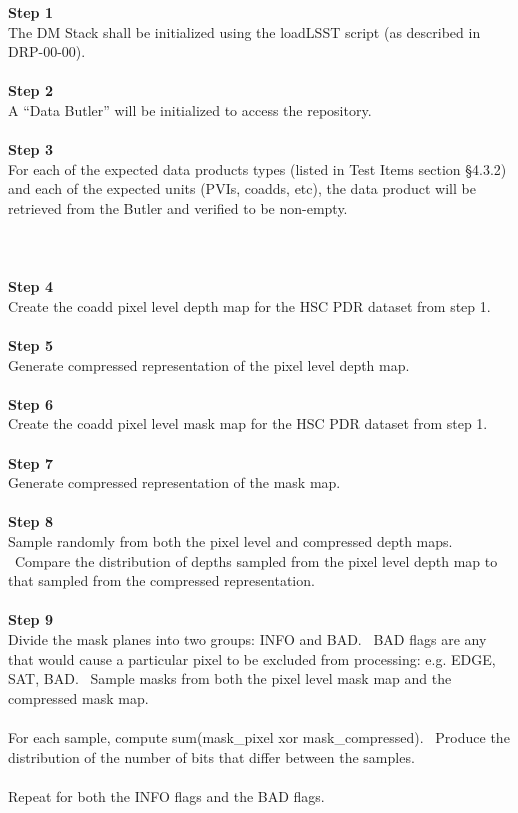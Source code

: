 \textbf{Step 1}\\
The DM Stack shall be initialized using the loadLSST script (as
described in DRP-00-00).\\
~\\
\textbf{Step 2}\\
A ``Data Butler'' will be initialized to access the repository.\\
~\\
\textbf{Step 3}\\
For each of the expected data products types (listed in Test Items
section §4.3.2) and each of the expected units (PVIs, coadds, etc), the
data product will be retrieved from the Butler and verified to be
non-empty.\\
~\\
~\\
~\\
\textbf{Step 4}\\
Create the coadd pixel level depth map for the HSC PDR dataset from step
1.\\
~\\
\textbf{Step 5}\\
Generate compressed representation of the pixel level depth map.\\
~\\
\textbf{Step 6}\\
Create the coadd pixel level mask map for the HSC PDR dataset from step
1.\\
~\\
\textbf{Step 7}\\
Generate compressed representation of the mask map.\\
~\\
\textbf{Step 8}\\
Sample randomly from both the pixel level and compressed depth maps.
~Compare the distribution of depths sampled from the pixel level depth
map to that sampled from the compressed representation.\\
~\\
\textbf{Step 9}\\
Divide the mask planes into two groups: INFO and BAD. ~BAD flags are any
that would cause a particular pixel to be excluded from processing: e.g.
EDGE, SAT, BAD. ~Sample masks from both the pixel level mask map and the
compressed mask map.\\
~\\
For each sample, compute sum(mask\_pixel xor mask\_compressed). ~Produce
the distribution of the number of bits that differ between the
samples.\\
~\\
Repeat for both the INFO flags and the BAD flags.\\
~\\

